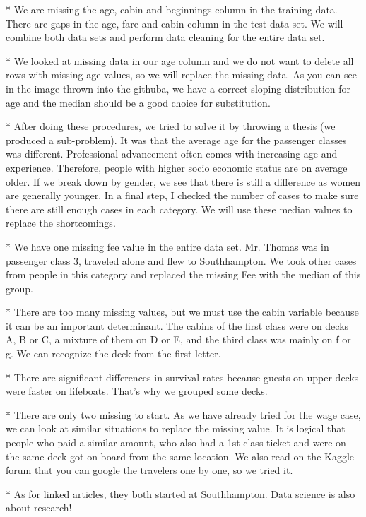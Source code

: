 \documentclass[onecolumn]{article}
\begin{document}
* We are missing the age, cabin and beginnings column in the training data. There are gaps in the age, fare and cabin column in the test data set. We will combine both data sets and perform data cleaning for the entire data set.


* We looked at missing data in our age column and we do not want to delete all rows with missing age values, so we will replace the missing data. As you can see in the image thrown into the githuba, we have a correct sloping distribution for age and the median should be a good choice for substitution.

* After doing these procedures, we tried to solve it by throwing a thesis (we produced a sub-problem). It was that the average age for the passenger classes was different. Professional advancement often comes with increasing age and experience. Therefore, people with higher socio economic status are on average older. If we break down by gender, we see that there is still a difference as women are generally younger. In a final step, I checked the number of cases to make sure there are still enough cases in each category. We will use these median values ​​to replace the shortcomings.


* We have one missing fee value in the entire data set. Mr. Thomas was in passenger class 3, traveled alone and flew to Southhampton. We took other cases from people in this category and replaced the missing Fee with the median of this group.

* There are too many missing values, but we must use the cabin variable because it can be an important determinant. The cabins of the first class were on decks A, B or C, a mixture of them on D or E, and the third class was mainly on f or g. We can recognize the deck from the first letter.

* There are significant differences in survival rates because guests on upper decks were faster on lifeboats. That's why we grouped some decks.

* There are only two missing to start. As we have already tried for the wage case, we can look at similar situations to replace the missing value. It is logical that people who paid a similar amount, who also had a 1st class ticket and were on the same deck got on board from the same location. We also read on the Kaggle forum that you can google the travelers one by one, so we tried it.


* As for linked articles, they both started at Southhampton. Data science is also about research!
\end{document}

